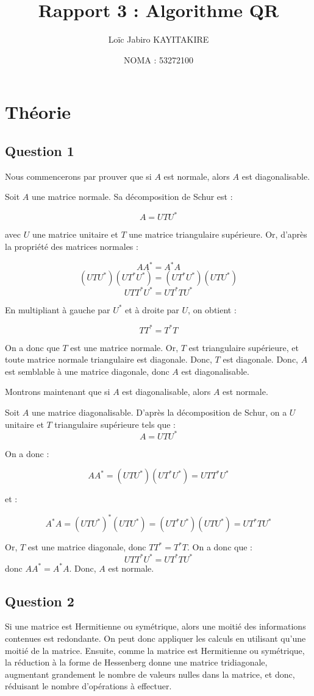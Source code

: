 \documentclass[11pt]{article}
\title{Rapport 3 : Algorithme QR}
\author{Loïc Jabiro KAYITAKIRE}
\date{NOMA : 53272100}
\begin{document}
\maketitle
\section{Théorie}

\subsection{Question 1}
Nous commencerons par prouver que si $A$ est normale, alors $A$ est diagonalisable.

Soit $A$ une matrice normale. Sa décomposition de Schur est :

$$A = UTU^*$$

avec $U$ une matrice unitaire et $T$ une matrice triangulaire supérieure.
Or, d'après la propriété des matrices normales :

$$AA^* = A^*A$$
$$(UTU^*) (UT^*U^*) = (UT^*U^*) (UTU^*)$$
$$UTT^*U^* = UT^*TU^*$$

En multipliant à gauche par $U^*$ et à droite par $U$, on obtient :

$$TT^* = T^*T$$

On a donc que $T$ est une matrice normale. Or, $T$ est triangulaire supérieure, et toute matrice normale triangulaire est diagonale. Donc, $T$ est diagonale. Donc, $A$ est semblable à une matrice diagonale, donc $A$ est diagonalisable.

Montrons maintenant que si $A$ est diagonalisable, alors $A$ est normale.

Soit $A$ une matrice diagonalisable. D'après la décomposition de Schur, on a $U$ unitaire et $T$ triangulaire supérieure tels que :
$$A = UTU^*$$

On a donc :

$$AA^* = (UTU^*) (UT^*U^*) = UTT^*U^*$$

et :

$$A^*A = (UTU^*)^*(UTU^*) = (UT^*U^*)(UTU^*) = UT^*TU^*$$

Or, $T$ est une matrice diagonale, donc $TT^* = T^*T$. On a donc que :
$$UTT^*U^* = UT^*TU^*$$ 
donc $AA^* = A^*A$. Donc, $A$ est normale.


\subsection{Question 2}
Si une matrice est Hermitienne ou symétrique, alors une moitié des informations contenues est redondante. On peut donc appliquer les calculs en utilisant qu'une moitié de la matrice.
Ensuite, comme la matrice est Hermitienne ou symétrique, la réduction à la forme de Hessenberg donne une matrice tridiagonale, augmentant grandement le nombre de valeurs nulles dans la matrice, et donc, réduisant le nombre d'opérations à effectuer.
\end{document}

